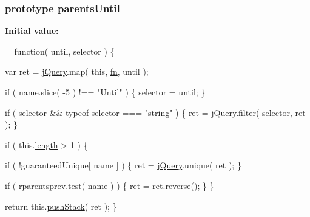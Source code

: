 \subsubsection[{parents\+Until}]{ {\bf prototype} parents\+Until}\label{jquery-1_810_82-vsdoc_8js_ae2d1b0226f1427006ca38baad3dd6968}
{\bfseries Initial value\+:}
\begin{DoxyCode}
= \textcolor{keyword}{function}( until, selector ) \{


        var ret = \hyperlink{jquery-1_810_82-vsdoc_8js_add5237586d970a38a81f990e8eb28c6c}{jQuery}.map( \textcolor{keyword}{this}, \hyperlink{jquery-1_810_82-vsdoc_8js_acef6bdaf6b9b20fdcca1ea86f0902c3b}{fn}, until );

        \textcolor{keywordflow}{if} ( name.slice( -5 ) !== \textcolor{stringliteral}{"Until"} ) \{
            selector = until;
        \}

        \textcolor{keywordflow}{if} ( selector && typeof selector === \textcolor{stringliteral}{"string"} ) \{
            ret = \hyperlink{jquery-1_810_82-vsdoc_8js_add5237586d970a38a81f990e8eb28c6c}{jQuery}.filter( selector, ret );
        \}

        \textcolor{keywordflow}{if} ( this.\hyperlink{jquery-1_810_82-vsdoc_8js_aa7de35d58da66d9944ab9cbe82c19640}{length} > 1 ) \{
            
            \textcolor{keywordflow}{if} ( !guaranteedUnique[ name ] ) \{
                ret = \hyperlink{jquery-1_810_82-vsdoc_8js_add5237586d970a38a81f990e8eb28c6c}{jQuery}.unique( ret );
            \}

            
            \textcolor{keywordflow}{if} ( rparentsprev.test( name ) ) \{
                ret = ret.reverse();
            \}
        \}

        \textcolor{keywordflow}{return} this.\hyperlink{jquery-1_810_82-vsdoc_8js_afc3a7db1ef2b526338c06c07cecccd44}{pushStack}( ret );
    \}
\end{DoxyCode}
\hypertarget{jquery-1_810_82-vsdoc_8js_a09aeded1ab567632f194acd1550eac88}{}
